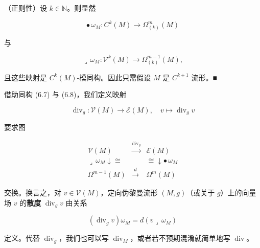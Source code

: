 \begin{remark}
\begin{items}
\item

（正则性）设 $ k \in \mathbb{N} $。则显然

\[
\bullet\,\omega_{M}: C^{k}(M) \to \Omega^{m}_{(k)}(M)
\]

与

\[
\lrcorner\,\omega_{M}: \mathcal{V}^{k}(M) \to \Omega^{m-1}_{(k)}(M),
\]

且这些映射是 $ C^{k}(M) $-模同构。因此只需假设 $ M $ 是 $ C^{k+1} $ 流形。\nobreak\hspace{0.35em}■

\end{items}

借助同构 (6.7) 与 (6.8)，我们定义映射

\begin{equation}
\operatorname{div}_{g}: \mathcal{V}(M) \to \mathcal{E}(M), \quad v \mapsto \operatorname{div}_{g} v\tag{6.11}
\end{equation}

要求图

\begin{equation}
\begin{array}{ccc} \mathcal{V}(M) & \xrightarrow{\operatorname{div}_{g}} & \mathcal{E}(M) \\ \lrcorner\,\omega_{M}\downarrow\cong & & \cong\downarrow\bullet\,\omega_{M} \\ \Omega^{m-1}(M) & \xrightarrow{d} & \Omega^{m}(M) \end{array}\tag{6.12}
\end{equation}

交换。换言之，对 $ v \in \mathcal{V}(M) $，定向伪黎曼流形 $ (M,g) $（或关于 $ g $）上的向量场 $ v $ 的\textbf{散度} $ \operatorname{div}_g v $ 由关系

\begin{equation}
(\operatorname{div}_{g} v)\omega_{M} = d(v\lrcorner\,\omega_{M})\tag{6.13}
\end{equation}

定义。代替 $ \operatorname{div}_g $，我们也可以写 $ \operatorname{div}_M $，或者若不预期混淆就简单地写 $ \operatorname{div} $。

\end{remark}

